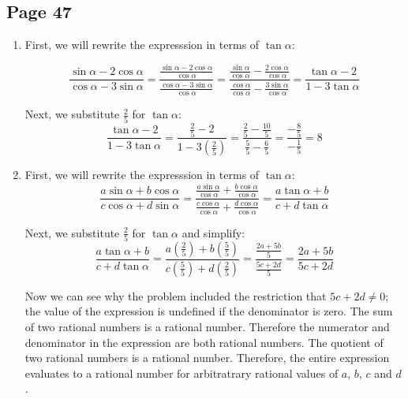 \documentclass{article}
\newenvironment{solutions}[1]
{\subsection*{#1}
 \begin{enumerate}[leftmargin=1.5em]}
{\end{enumerate}}
\newcommand{\solution}{\item}
\newenvironment{subsolutions}
{\begin{enumerate}}
{\end{enumerate}}
\newcommand{\subsolution}{\item}
\begin{document}
\begin{solutions}{Page 47}
\begin{subsolutions}
\subsolution
Substituting $r$ for $\tan{\alpha}$ in the formula above:
\begin{equation*}
\cos^{2}{\alpha} - \sin^{2}{\alpha} = \frac{1 - r^2}{1 + r^2}
\end{equation*}

\end{subsolutions}

\solution %
First, we will rewrite the expresssion in terms of $\tan{\alpha}$:

\begin{equation*}
\frac{\sin{\alpha} - 2\cos{\alpha}}{\cos{\alpha} - 3\sin{\alpha}} = \frac{\frac{\sin{\alpha} - 2\cos{\alpha}}{\cos{\alpha}}}{\frac{\cos{\alpha} - 3\sin{\alpha}}{\cos{\alpha}}} = \frac{\frac{\sin{\alpha}}{\cos{\alpha}} - \frac{2\cos{\alpha}}{\cos{\alpha}}}{\frac{\cos{\alpha}}{\cos{\alpha}} - \frac{3\sin{\alpha}}{\cos{\alpha}}} = \frac{\tan{\alpha} - 2}{1 - 3\tan{\alpha}}
\end{equation*}

Next, we substitute  $\frac{2}{5}$ for $\tan{\alpha}$:
\begin{equation*}
\frac{\tan{\alpha} - 2}{1 - 3\tan{\alpha}} = \frac{\frac{2}{5} - 2}{1 - 3\left(\frac{2}{5}\right)} = \frac{\frac{2}{5} - \frac{10}{5}}{\frac{5}{5} - \frac{6}{5}} = \frac{-\frac{8}{5}}{-\frac{1}{5}} = 8
\end{equation*}


\solution %
First, we will rewrite the expresssion in terms of $\tan{\alpha}$:
\begin{equation*}
\frac{a\sin{\alpha} + b\cos{\alpha}}{c\cos{\alpha} + d\sin{\alpha}} = \frac{\frac{a\sin{\alpha}}{\cos{\alpha}} + \frac{b\cos{\alpha}}{\cos{\alpha}}}{\frac{c\cos{\alpha}}{\cos{\alpha}} + \frac{d\cos{\alpha}}{\cos{\alpha}}} = \frac{a\tan{\alpha} + b}{c + d\tan{\alpha}}
\end{equation*}

Next, we substitute  $\frac{2}{5}$ for $\tan{\alpha}$ and simplify:
\begin{equation*}
\frac{a\tan{\alpha} + b}{c + d\tan{\alpha}} = \frac{a\left(\frac{2}{5}\right) + b\left(\frac{5}{5}\right)}{c\left(\frac{5}{5}\right) + d\left(\frac{2}{5}\right)} = \frac{\frac{2a + 5b}{5}}{\frac{5c+2d}{5}} = \frac{2a + 5b}{5c + 2d}
\end{equation*}

Now we can see why the problem included the restriction that $5c + 2d \neq 0$; the value of the expression is undefined if the denominator is zero. The sum of two rational numbers is a rational number. Therefore the numerator and denominator in the expression are both rational numbers. The quotient of two rational numbers is a rational number. Therefore, the entire expression evaluates to a rational number for arbitratrary rational values of $a$, $b$, $c$ and $d$.


\end{solutions}
\end{document}
